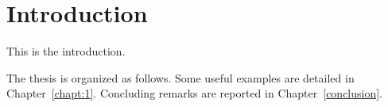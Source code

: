 \chapter{Introduction}
\label{introduction}
This is the introduction.

The thesis is organized as follows. Some useful examples are detailed in Chapter~\ref{chapt:1}. Concluding remarks are reported in Chapter~\ref{conclusion}.


